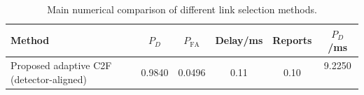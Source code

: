 \begin{table}[t]
    \centering
    \caption{Main numerical comparison of different link selection methods.}
    \label{tab:main_summary}
    \begin{tabular}{l c c c c c}
        \hline
        Method & $P_D$ & $P_{\mathrm{FA}}$ & Delay/ms & Reports & $P_D$/ms \\
        \hline
        Proposed adaptive C2F (detector-aligned) & 0.9840 & 0.0496 & 0.11 & 0.10 & 9.2250 \
        \hline
    \end{tabular}
\end{table}
